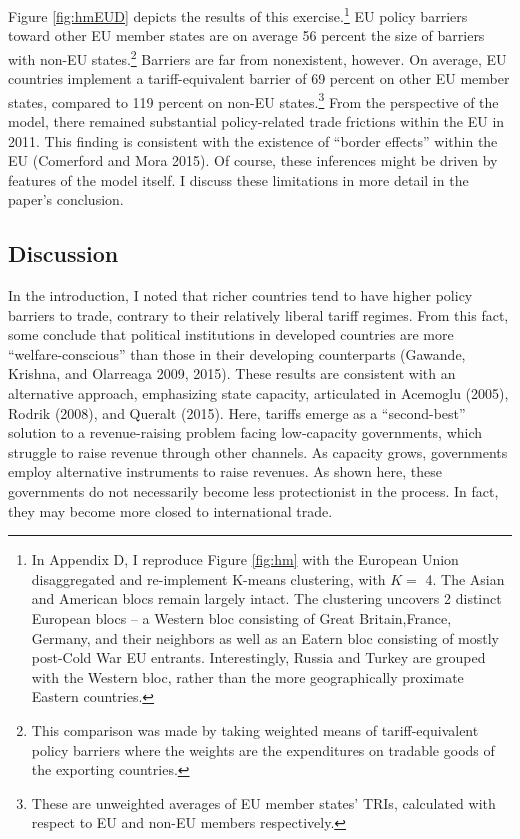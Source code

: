 \documentclass{puthesis}
\begin{document}
Figure \ref{fig:hmEUD} depicts the results of this exercise.\footnote{In
  Appendix D, I reproduce Figure \ref{fig:hm} with the European Union
  disaggregated and re-implement K-means clustering, with \(K=\) 4. The
  Asian and American blocs remain largely intact. The clustering
  uncovers 2 distinct European blocs -- a Western bloc consisting of
  Great Britain,France, Germany, and their neighbors as well as an
  Eatern bloc consisting of mostly post-Cold War EU entrants.
  Interestingly, Russia and Turkey are grouped with the Western bloc,
  rather than the more geographically proximate Eastern countries.} EU
policy barriers toward other EU member states are on average 56 percent
the size of barriers with non-EU states.\footnote{This comparison was
  made by taking weighted means of tariff-equivalent policy barriers
  where the weights are the expenditures on tradable goods of the
  exporting countries.} Barriers are far from nonexistent, however. On
average, EU countries implement a tariff-equivalent barrier of 69
percent on other EU member states, compared to 119 percent on non-EU
states.\footnote{These are unweighted averages of EU member states'
  TRIs, calculated with respect to EU and non-EU members respectively.}
From the perspective of the model, there remained substantial
policy-related trade frictions within the EU in 2011. This finding is
consistent with the existence of ``border effects'' within the EU
(Comerford and Mora 2015). Of course, these inferences might be driven
by features of the model itself. I discuss these limitations in more
detail in the paper's conclusion.

\subsection{Discussion}

In the introduction, I noted that richer countries tend to have higher
policy barriers to trade, contrary to their relatively liberal tariff
regimes. From this fact, some conclude that political institutions in
developed countries are more ``welfare-conscious'' than those in their
developing counterparts (Gawande, Krishna, and Olarreaga 2009, 2015).
These results are consistent with an alternative approach, emphasizing
state capacity, articulated in Acemoglu (2005), Rodrik (2008), and
Queralt (2015). Here, tariffs emerge as a ``second-best'' solution to a
revenue-raising problem facing low-capacity governments, which struggle
to raise revenue through other channels. As capacity grows, governments
employ alternative instruments to raise revenues. As shown here, these
governments do not necessarily become less protectionist in the process.
In fact, they may become more closed to international trade.
\end{document}

